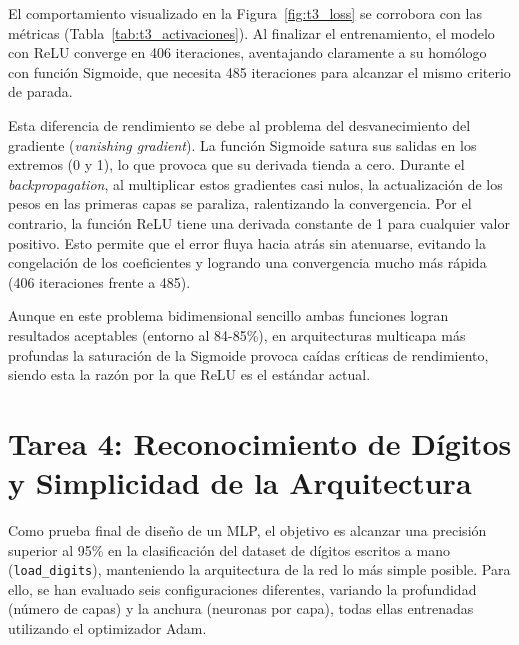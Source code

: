 \documentclass[../../__memoria.tex]{subfiles}
\begin{document}
El comportamiento visualizado en la Figura~\ref{fig:t3_loss} se corrobora con las métricas (Tabla~\ref{tab:t3_activaciones}). Al finalizar el entrenamiento, el modelo con ReLU converge en 406 iteraciones, aventajando claramente a su homólogo con función Sigmoide, que necesita 485 iteraciones para alcanzar el mismo criterio de parada.

Esta diferencia de rendimiento se debe al problema del desvanecimiento del gradiente (\textit{vanishing gradient}). La función Sigmoide satura sus salidas en los extremos (0 y 1), lo que provoca que su derivada tienda a cero. Durante el \textit{backpropagation}, al multiplicar estos gradientes casi nulos, la actualización de los pesos en las primeras capas se paraliza, ralentizando la convergencia. Por el contrario, la función ReLU tiene una derivada constante de 1 para cualquier valor positivo. Esto permite que el error fluya hacia atrás sin atenuarse, evitando la congelación de los coeficientes y logrando una convergencia mucho más rápida (406 iteraciones frente a 485). 

Aunque en este problema bidimensional sencillo ambas funciones logran resultados aceptables (entorno al 84-85\%), en arquitecturas multicapa más profundas la saturación de la Sigmoide provoca caídas críticas de rendimiento, siendo esta la razón por la que ReLU es el estándar actual.

\section[Tarea 4: Análisis en Dígitos]{Tarea 4: Reconocimiento de Dígitos y Simplicidad de la Arquitectura}

Como prueba final de diseño de un MLP, el objetivo es alcanzar una precisión superior al 95\% en la clasificación del dataset de dígitos escritos a mano (\texttt{load\_digits}), manteniendo la arquitectura de la red lo más simple posible. Para ello, se han evaluado seis configuraciones diferentes, variando la profundidad (número de capas) y la anchura (neuronas por capa), todas ellas entrenadas utilizando el optimizador Adam.
\end{document}
